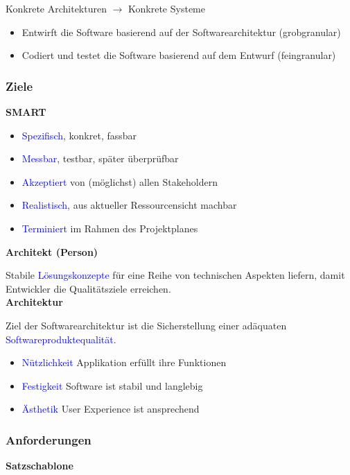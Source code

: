 Konkrete Architekturen $\rightarrow$ Konkrete Systeme

\begin{itemize}
    \item Entwirft die Software basierend auf der Softwarearchitektur (grobgranular)
    \item Codiert und testet die Software basierend auf dem Entwurf (feingranular)

\end{itemize}

\subsubsection{Ziele}

\textbf{SMART}

\begin{itemize}
    \item \textcolor{blue}{Spezifisch}, konkret, fassbar
    \item \textcolor{blue}{Messbar}, testbar, später überprüfbar
    \item \textcolor{blue}{Akzeptiert} von (möglichst) allen Stakeholdern
    \item \textcolor{blue}{Realistisch}, aus aktueller Ressourcensicht machbar
    \item \textcolor{blue}{Terminiert} im Rahmen des Projektplanes
\end{itemize}
\vspace{10pt}
\textbf{Architekt (Person)}

Stabile \textcolor{blue}{Lösungskonzepte} für eine Reihe von technischen Aspekten liefern, damit Entwickler die Qualitätsziele erreichen. \\

\textbf{Architektur}

Ziel der Softwarearchitektur ist die Sicherstellung einer
adäquaten \textcolor{blue}{Softwareproduktequalität}.

\begin{itemize}
    \item \textcolor{blue}{Nützlichkeit} Applikation erfüllt ihre Funktionen
    \item \textcolor{blue}{Festigkeit} Software ist stabil und langlebig
    \item \textcolor{blue}{Ästhetik} User Experience ist ansprechend
\end{itemize}
\vspace{10pt}

\subsubsection{Anforderungen}
\textbf{Satzschablone}

